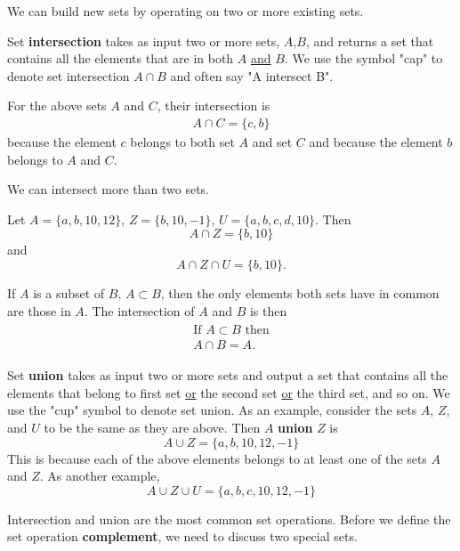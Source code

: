 We can build new sets by operating on two or more existing sets.

Set \textbf{intersection} takes as input two or more sets, $A$,$B$, and returns a set that contains all the elements that are in both $A$ \underline{and} $B$.
We use the symbol "cap" to denote set intersection $A \cap B$ and often say "A intersect B". 

For the above sets $A$ and $C$, their intersection is 
\begin{align}
    A \cap C = \{c,b\}
\end{align}
because the element $c$ belongs to both set $A$ and set $C$ and because the element $b$ belongs to $A$ and $C$.

We can intersect more than two sets. 

Let $A =\{ a,b,10,12 \}$, $Z =\{ b,10,-1 \}$, $U =\{ a,b,c,d,10 \}$.
Then
\begin{equation}
    A \cap Z = \{ b,10 \}    
\end{equation}
and 
\begin{equation}
 A \cap Z \cap U = \{ b,10\}.
\end{equation}

If $A$ is a subset of $B$, $A \subset B$, then the only elements both sets have in common are those in $A$. 
The intersection of $A$ and $B$ is then
\begin{align}
    \begin{aligned}
      \text{If } A \subset B \text{ then}\\
       A \cap B = A.
    \end{aligned} \label{subsetInter}
\end{align}

Set \textbf{union} takes as input two or more sets and output a set that contains all the elements that belong to first set \underline{or} the second set \underline{or} the third set, and so on.
We use the "cup" symbol to denote set union. 
As an example, consider the sets $A$, $Z$, and $U$ to be the same as they are above. 
Then $A$ \textbf{union} $Z$ is 
\begin{equation}
    A \cup Z = \{a,b,10,12,-1\}
\end{equation}
This is because each of the above elements belongs to at least one of the sets $A$ and $Z$. As another example, 
\begin{equation}
    A \cup Z \cup U = \{a,b,c,10,12,-1\}
\end{equation}

Intersection and union are the most common set operations. 
Before we define the set operation \textbf{complement}, we need to discuss two special sets. 

